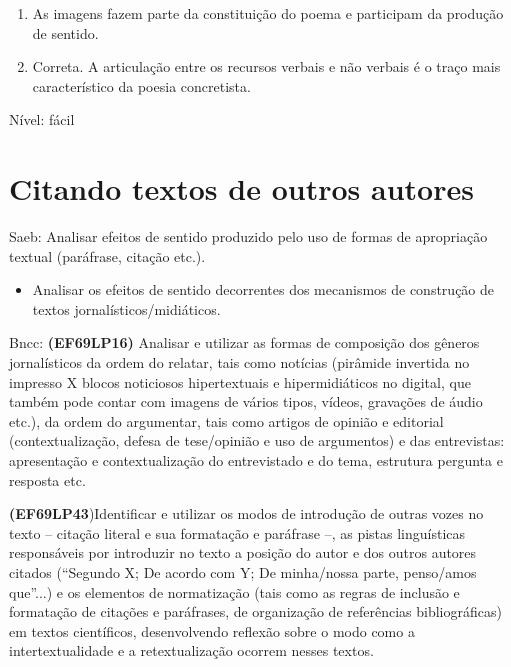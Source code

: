 {\begin{enumerate}
\def\labelenumi{\arabic{enumi}.}
\item
  As imagens fazem parte da constituição do poema e participam da
  produção de sentido.
\item
  Correta. A articulação entre os recursos verbais e não verbais é o
  traço mais característico da poesia concretista.
\end{enumerate}

Nível: fácil

\pagestyle{port}
\chapter{Citando textos de outros autores}

Saeb: Analisar efeitos de sentido produzido pelo uso de formas de
apropriação textual (paráfrase, citação etc.).

\begin{itemize}
\tightlist
\item
  Analisar os efeitos de sentido decorrentes dos mecanismos de
  construção de textos jornalísticos/midiáticos.
\end{itemize}

Bncc: \textbf{(EF69LP16)} Analisar e utilizar as formas de composição
dos gêneros jornalísticos da ordem do relatar, tais como notícias
(pirâmide invertida no impresso X blocos noticiosos hipertextuais e
hipermidiáticos no digital, que também pode contar com imagens de vários
tipos, vídeos, gravações de áudio etc.), da ordem do argumentar, tais
como artigos de opinião e editorial (contextualização, defesa de
tese/opinião e uso de argumentos) e das entrevistas: apresentação e
contextualização do entrevistado e do tema, estrutura pergunta e
resposta etc.

\textbf{(EF69LP43})Identificar e utilizar os modos de introdução de
outras vozes no texto -- citação literal e sua formatação e paráfrase
--, as pistas linguísticas responsáveis por introduzir no texto a
posição do autor e dos outros autores citados (``Segundo X; De acordo
com Y; De minha/nossa parte, penso/amos que''...) e os elementos de
normatização (tais como as regras de inclusão e formatação de citações e
paráfrases, de organização de referências bibliográficas) em textos
científicos, desenvolvendo reflexão sobre o modo como a
intertextualidade e a retextualização ocorrem nesses textos.

}
